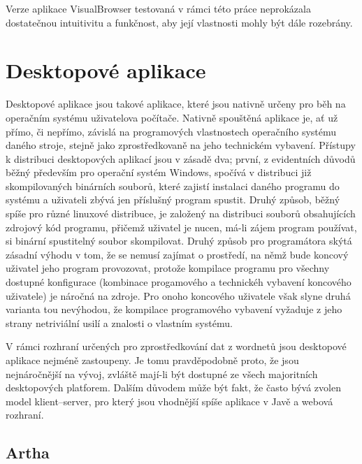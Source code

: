 \documentclass[a4paper, 11pt, oneside]{book}
\begin{document}
				Verze aplikace VisualBrowser testovaná v rámci této práce neprokázala dostatečnou intuitivitu a funkčnost, aby její vlastnosti mohly být dále rozebrány. 

		\chapter{Desktopové aplikace}

			Desktopové aplikace jsou takové aplikace, které jsou nativně určeny pro běh na operačním systému uživatelova počítače. Nativně spouštěná aplikace je, ať už přímo, či nepřímo, závislá na programových vlastnostech operačního systému daného stroje, stejně jako zprostředkovaně na jeho technickém vybavení. Přístupy k distribuci desktopových aplikací jsou v zásadě dva; první, z evidentních důvodů běžný především pro operační systém Windows, spočívá v distribuci již skompilovaných binárních souborů, které zajistí instalaci daného programu do systému a uživateli zbývá jen příslušný program spustit. Druhý způsob, běžný spíše pro různé linuxové distribuce, je založený na distribuci souborů obsahujících zdrojový kód programu, přičemž uživatel je nucen, má-li zájem program používat, si binární spustitelný soubor skompilovat. Druhý způsob pro programátora skýtá zásadní výhodu v tom, že se nemusí zajímat o prostředí, na němž bude koncový uživatel jeho program provozovat, protože kompilace programu pro všechny dostupné konfigurace (kombinace progamového a technickéh vybavení koncového uživatele) je náročná na zdroje. \parencite{Elizabeth2015} Pro onoho koncového uživatele však slyne druhá varianta tou nevýhodou, že kompilace programového vybavení vyžaduje z jeho strany netriviální usilí a znalosti o vlastním systému. 

			V rámci rozhraní určených pro zprostředkování dat z wordnetů jsou desktopové aplikace nejméně zastoupeny. Je tomu pravděpodobně proto, že jsou nejnáročnější na vývoj, zvláště mají-li být dostupné ze všech majoritních desktopových platforem. Dalším důvodem může být fakt, že často bývá zvolen model klient--server, pro který jsou vhodnější spíše aplikace v Javě \parencite[13]{gosling1995java} a webová rozhraní.

			\section{Artha}
\end{document}
